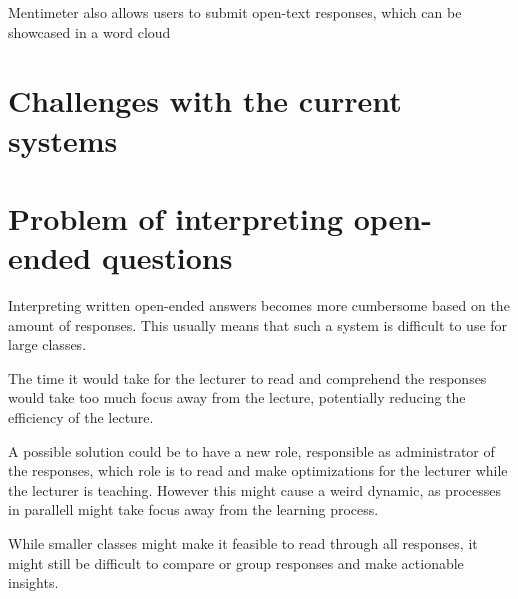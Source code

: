 Mentimeter also allows users to submit open-text responses, which can be showcased in a word cloud


\section{Challenges with the current systems}


\section{Problem of interpreting open-ended questions}
Interpreting written open-ended answers becomes more cumbersome based on the amount of responses. This usually means that such a system is difficult to use for large classes. 

The time it would take for the lecturer to read and comprehend the responses would take too much focus away from the lecture, potentially reducing the efficiency of the lecture. 

A possible solution could be to have a new role, responsible as administrator of the responses, which role is to read and make optimizations for the lecturer while the lecturer is teaching. However this might cause a weird dynamic, as processes in parallell might take focus away from the learning process.

While smaller classes might make it feasible to read through all responses, it might still be difficult to compare or group responses and make actionable insights. 








